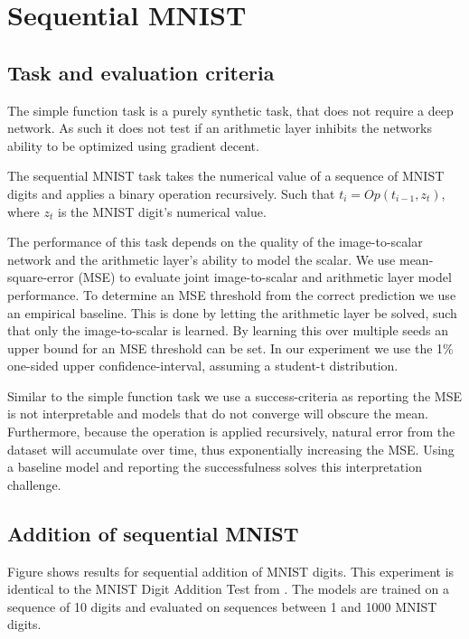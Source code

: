 \section{Sequential MNIST}

\subsection{Task and evaluation criteria}
The simple function task is a purely synthetic task, that does not require a deep network. As such it does not test if an arithmetic layer inhibits the networks ability to be optimized using gradient decent.

The sequential MNIST task takes the numerical value of a sequence of MNIST digits and applies a binary operation recursively. Such that $t_i = Op(t_{i-1}, z_t)$, where $z_t$ is the MNIST digit's numerical value.

The performance of this task depends on the quality of the image-to-scalar network and the arithmetic layer's ability to model the scalar. We use mean-square-error (MSE) to evaluate joint image-to-scalar and arithmetic layer model performance. To determine an MSE threshold from the correct prediction we use an empirical baseline. This is done by letting the arithmetic layer be solved, such that only the image-to-scalar is learned. By learning this over multiple seeds an upper bound for an MSE threshold can be set. In our experiment we use the 1\% one-sided upper confidence-interval, assuming a student-t distribution.

Similar to the simple function task we use a success-criteria as reporting the MSE is not interpretable and models that do not converge will obscure the mean. Furthermore, because the operation is applied recursively, natural error from the dataset will accumulate over time, thus exponentially increasing the MSE. Using a baseline model and reporting the successfulness solves this interpretation challenge.

\subsection{Addition of sequential MNIST}

Figure \label{fig:sequential-mnist-sum} shows results for sequential addition of MNIST digits. This experiment is identical to the MNIST Digit Addition Test from \citet[section 4.2]{trask-nalu}. The models are trained on a sequence of 10 digits and evaluated on sequences between 1 and 1000 MNIST digits.

